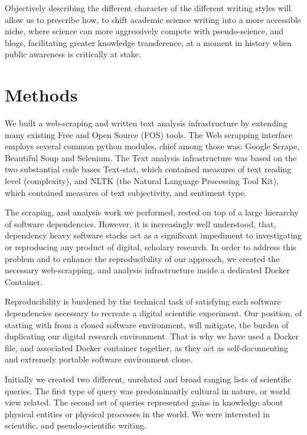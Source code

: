 \documentclass{clv3}
\begin{document}
Objectively describing the different character of the different writing styles will allow us to prescribe how, to shift academic science writing into a more accessible niche, where science can more aggressively compete with pseudo-science, and blogs, facilitating greater knowledge transference, at a moment in history when public awareness is critically at stake.


\section{Methods}

We built a web-scraping and written text analysis infrastructure by extending many existing Free and Open Source (FOS) tools. The Web scrapping interface employs several common python modules, chief among those was: Google Scrape, Beautiful Soup and Selenium. The Text analysis infrastructure was based on the two substantial code bases Text-stat, which contained measures of text reading level (complexity), and NLTK (the Natural Language Processing Tool Kit), which contained measures of text subjectivity, and sentiment type.

The scraping, and analysis work we performed, rested on top of a large hierarchy of software dependencies. However, it is increasingly well understood, that, dependency heavy software stacks act as a significant impediment to investigating or reproducing any product of digital, scholary research. In order to address this problem and to enhance the reproducibility of our approach, we created the necessary web-scrapping, and analysis infrastructure inside a dedicated Docker Container.

Reproducibility is burdened by the technical task of satisfying each software dependencies necessary to recreate a digital scientific experiment. Our position, of starting with from a cloned software environment, will mitigate, the burden of duplicating our digital research environment. That is why we have used a Docker file, and associated Docker container together, as they act as self-documenting and extremely portable software environment clone.

Initially we created two different, unrelated and broad ranging lists of scientific queries. The first type of query was predominantly cultural in nature, or world view related. The second set of queries represented gains in knowledge about physical entities or physical processes in the world. We were interested in scientific, and pseudo-scientific writing.\\
\end{document}
